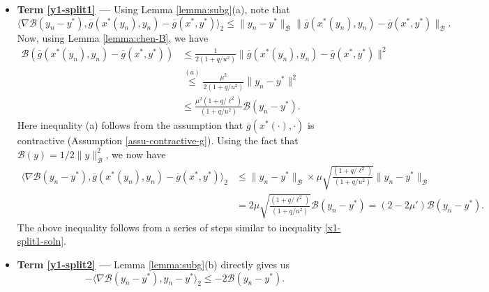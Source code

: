 \documentclass[letterpaper, 10 pt, conference]{ieeeconf}  %
\theoremstyle{definition}
\theoremstyle{plain}
\newcommand{\barg}{\overline{g}}
\newcommand{\xstar}{x^*}
\newcommand{\ystar}{y^*}
\newcommand{\Bcal}{\mathcal{B}}
\begin{document}
\begin{itemize}
    \item \textbf{Term \ref{y1-split1} --- } Using Lemma \ref{lemma:subg}(a), note that
$$\langle\nabla \Bcal(y_n-\ystar),\barg(\xstar(y_n),y_n)-\barg(\xstar,\ystar)\rangle_2\leq \|y_n-\ystar\|_\Bcal\|\barg(x^*(y_n),y_n)-\barg(\xstar,\ystar)\|_\Bcal.$$
Now, using Lemma \ref{lemma:chen-B}, we have
\begin{align*}
    \Bcal(\barg(x^*(y_n),y_n)-\barg(\xstar,\ystar))&\leq \frac{1}{2(1+q/u^2)}\|\barg(x^*(y_n),y_n)-\barg(\xstar,\ystar)\|^2\\
    &\stackrel{(a)}{\leq} \frac{\mu^2}{2(1+q/u^2)} \|y_n-\ystar\|^2\\
    &\leq \frac{\mu^2(1+q/\ell^2)}{(1+q/u^2)} \Bcal(y_n-\ystar).
\end{align*}
Here inequality (a) follows from the assumption that $\barg(\xstar(\cdot),\cdot)$ is contractive (Assumption \ref{assu-contractive-g}). Using the fact that $\Bcal(y)=1/2\|y\|_\Bcal^2$, we now have
\begin{align}\label{y1-split1-soln}
    \langle\nabla \Bcal(y_n-\ystar),\barg(\xstar(y_n),y_n)-\barg(\xstar,\ystar)\rangle_2&\leq\|y_n-\ystar\|_\Bcal\times \mu\sqrt{\frac{(1+q/\ell^2)}{(1+q/u^2)}}\|y_n-\ystar\|_\Bcal\nonumber\\
    &=2\mu\sqrt{\frac{(1+q/\ell^2)}{(1+q/u^2)}}\Bcal(y_n-\ystar)=(2-2\mu')\Bcal(y_n-\ystar).
\end{align}
The above inequality follows from a series of steps similar to inequality \eqref{x1-split1-soln}.
\item \textbf{Term \ref{y1-split2} --- } Lemma \ref{lemma:subg}(b) directly gives us
\begin{equation}\label{y1-split2-soln}
    -\langle\nabla \Bcal(y_n-\ystar),y_n-\ystar\rangle_2\leq -2\Bcal(y_n-\ystar).
\end{equation}


\end{itemize}
\end{document}
